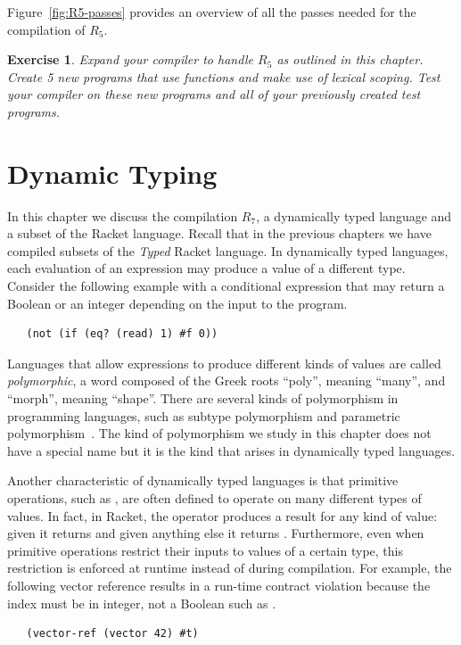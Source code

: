 \documentclass[11pt]{book}
\newtheorem{exercise}[theorem]{Exercise}
\begin{document}
Figure~\ref{fig:R5-passes} provides an overview of all the passes needed
for the compilation of $R_5$.

\begin{exercise}\normalfont
Expand your compiler to handle $R_5$ as outlined in this chapter.
Create 5 new programs that use  functions and make use of
lexical scoping. Test your compiler on these new programs and all of
your previously created test programs.
\end{exercise}


\chapter{Dynamic Typing}
\label{ch:type-dynamic}

In this chapter we discuss the compilation $R_7$, a dynamically typed
language and a subset of the Racket language. Recall that in the
previous chapters we have compiled subsets of the \emph{Typed} Racket
language. In dynamically typed languages, each evaluation of an
expression may produce a value of a different type. Consider the
following example with a conditional expression that may return a
Boolean or an integer depending on the input to the program.
\begin{lstlisting}
   (not (if (eq? (read) 1) #f 0))
\end{lstlisting}
Languages that allow expressions to produce different kinds of values
are called \emph{polymorphic}, a word composed of the Greek roots
``poly'', meaning ``many'', and ``morph'', meaning ``shape''.  There
are several kinds of polymorphism in programming languages, such as
subtype polymorphism and parametric
polymorphism~\citep{Cardelli:1985kx}. The kind of polymorphism we
study in this chapter does not have a special name but it is the kind
that arises in dynamically typed languages.

Another characteristic of dynamically typed languages is that
primitive operations, such as , are often defined to operate
on many different types of values. In fact, in Racket, the 
operator produces a result for any kind of value: given  it
returns  and given anything else it returns .
Furthermore, even when primitive operations restrict their inputs to
values of a certain type, this restriction is enforced at runtime
instead of during compilation. For example, the following vector
reference results in a run-time contract violation because the index
must be in integer, not a Boolean such as .
\begin{lstlisting}
   (vector-ref (vector 42) #t)
\end{lstlisting}
\end{document}
